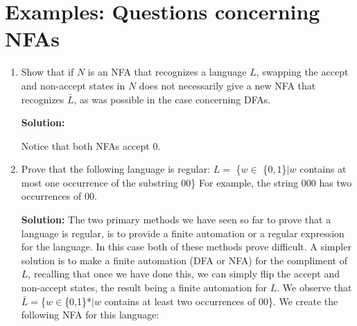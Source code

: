 \documentclass[twoside]{article}
\begin{document}
\section{Examples: Questions concerning NFAs}

\begin{enumerate}
\item Show that if $N$ is an NFA that recognizes a language $L$, swapping the accept and non-accept states in $N$ does not necessarily give a new NFA that recognizes $\bar{L}$, as was possible in the case concerning DFAs.\newline

\textbf{Solution:}\newline

\qquad
{}
Notice that both NFAs accept $0$.\newline

\item Prove that the following language is regular:\newline
$L = $ \{$w \in$ \{$0, 1$\}$| w$ contains at most one occurrence of the substring 00\}\newline
For example, the string 000 has two occurrences of 00.\newline

\textbf{Solution: } The two primary methods we have seen so far to prove that a language is regular, is to provide a finite automation or a regular expression for the language. In this case both of these methods prove difficult. A simpler solution is to make a finite automation (DFA or NFA) for the compliment of $L$, recalling that once we have done this, we can simply flip the accept and non-accept states, the result being a finite automation for $L$.\newline
We observe that $\bar{L} = $\{$w\in$\{0,1\}*$| w$ contains at least two occurrences of 00\}. We create the following NFA for this language: \newline


\end{enumerate}
\end{document}
